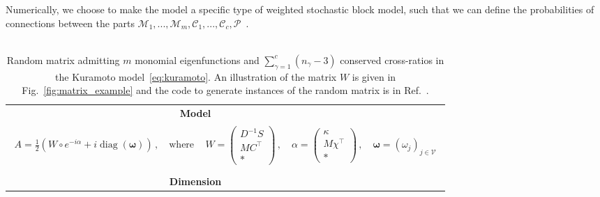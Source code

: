 \documentclass[aps,pre,reprint,longbibliography,superscriptaddress,noshowpacs,floatfix]{revtex4-2}
\theoremstyle{definition}
\theoremstyle{remark}
\DeclareMathOperator{\diag}{diag}
\begin{document}
Numerically, we choose to make the model a specific type of weighted stochastic block model, such that we can define the probabilities of connections between the parts $\mathcal{M}_1,...,\mathcal{M}_m, \mathcal{C}_1, ..., \mathcal{C}_c, \mathcal{P}$~\cite{Thibeault2026_koopman_kuramoto}.


\begin{table}[t]
\caption{\\ 
Random matrix admitting $m$ monomial eigenfunctions and $\sum_{\gamma=1}^c(n_{\gamma} -3)$ conserved cross-ratios in the Kuramoto model~\eqref{eq:kuramoto}. An illustration of the matrix $W$ is given in Fig.~\ref{fig:matrix_example} and the code to generate instances of the random matrix is in Ref.~\cite{Thibeault2026_koopman_kuramoto}.}
\begin{ruledtabular}
\label{tab:random_graph}
\begin{tabular}{ c c }

\textbf{Model} & \vspace{-0.7cm}\\

\multicolumn{2}{c}{\parbox[t]{16cm}{\begin{align}\label{eq:complex_random_matrix} 
A = \frac{1}{2}\left( W \circ e^{-i\alpha} + i\diag(\bm{\omega})\right)\,,\quad \text{where}\,\quad W = \begin{pmatrix}
        D^{-1}S\\
        MC^\top\\ 
        *
    \end{pmatrix}\,,\quad \alpha = \begin{pmatrix}
        \kappa\\
        M\chi^\top\\ 
        *
    \end{pmatrix}\,,\quad \bm{\omega} = (\omega_j)_{j\in\mathcal{V}}
\end{align}}}

\vspace{-0.6cm}\\ 

\\
\textbf{Dimension} &
\\


\end{tabular}
\end{ruledtabular}
\end{table}
\end{document}
